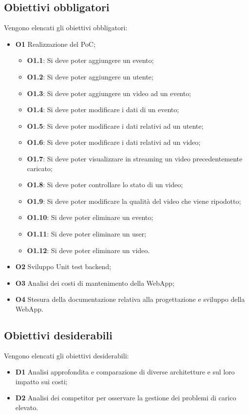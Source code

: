 \subsection{Obiettivi obbligatori}
\label{sec:requsitiobb}
Vengono elencati gli obiettivi obbligatori:
\begin{itemize}
    \item \textbf{O1} Realizzazione del PoC;
    \begin{itemize}
        \item\textbf{O1.1}: Si deve poter aggiungere un evento;
        \item\textbf{O1.2}: Si deve poter aggiungere un utente;
        \item\textbf{O1.3}: Si deve poter aggiungere un video ad un evento;
        \item\textbf{O1.4}: Si deve poter modificare i dati di un evento;
        \item\textbf{O1.5}: Si deve poter modificare i dati relativi ad un utente;
        \item\textbf{O1.6}: Si deve poter modificare i dati relativi ad un video;
        \item\textbf{O1.7}: Si deve poter visualizzare in streaming un video precedentemente caricato;
        \item\textbf{O1.8}: Si deve poter controllare lo stato di un video;
        \item\textbf{O1.9}: Si deve poter modificare la qualità del video che viene ripodotto;
        \item\textbf{O1.10}: Si deve poter eliminare un evento;
        \item\textbf{O1.11}: Si deve poter eliminare un user;
        \item\textbf{O1.12}: Si deve poter eliminare un video.
    \end{itemize}
    \item \textbf{O2} Sviluppo Unit test backend;
    \item \textbf{O3} Analisi dei costi di mantenimento della WebApp;
    \item \textbf{O4} Stesura della documentazione relativa alla progettazione e sviluppo della WebApp.
\end{itemize}
\subsection{Obiettivi desiderabili}
Vengono elencati gli obiettivi desiderabili:
\begin{itemize}
    \item \textbf{D1} Analisi approfondita e comparazione di diverse architetture e sul loro impatto sui costi;
    \item \textbf{D2} Analisi dei competitor per osservare la gestione dei problemi di carico elevato.
\end{itemize}
